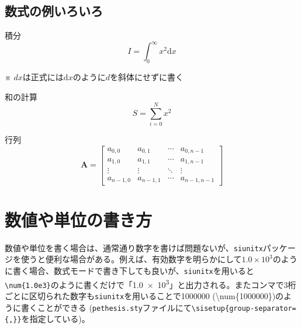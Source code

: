 \subsection{数式の例いろいろ}

\begin{titlebox}{積分}
  \adjustdisplayskips{1mm}
  \begin{equation}
    I = \int_0^{\infty} x^2 \mathrm{d}x
  \end{equation}
  \begin{center}
    ※ $dx$は正式には$\mathrm{d}x$のように$d$を斜体にせずに書く
  \end{center}
\end{titlebox}

\begin{titlebox}{和の計算}
  \adjustdisplayskips{1mm}
  \begin{equation}
    S = \sum_{i=0}^N x^2
  \end{equation}
\end{titlebox}

\begin{titlebox}{行列}
  \adjustdisplayskips{1mm}
  \begin{equation}
    \mathbf{A} = \begin{bmatrix}
      a_{0,0} & a_{0,1} & \cdots & a_{0,n-1} \\
      a_{1,0} & a_{1,1} & \cdots & a_{1,n-1} \\
      \vdots & \vdots & \ddots & \vdots \\
      a_{n-1,0} & a_{n-1,1} & \cdots & a_{n-1,n-1}
    \end{bmatrix}
  \end{equation}
\end{titlebox}

\section{数値や単位の書き方}
\label{sec:numbers-and-units}

数値や単位を書く場合は、通常通り数字を書けば問題ないが、\texttt{siunitx}パッケージを使うと便利な場合がある。例えば、有効数字を明らかにして$1.0 \times 10^3$のように書く場合、数式モードで書き下しても良いが、\texttt{siunitx}を用いると\texttt{\textbackslash num\{1.0e3\}}のように書くだけで「\num{1.0e3}」と出力される。またコンマで3桁ごとに区切られた数字も\texttt{siunitx}を用いることで\num{1000000} (\textbackslash num\{1000000\})のように書くことができる (\texttt{pethesis.sty}ファイルにて\texttt{\textbackslash sisetup\{group-separator=\{,\}\}}を指定している)。

